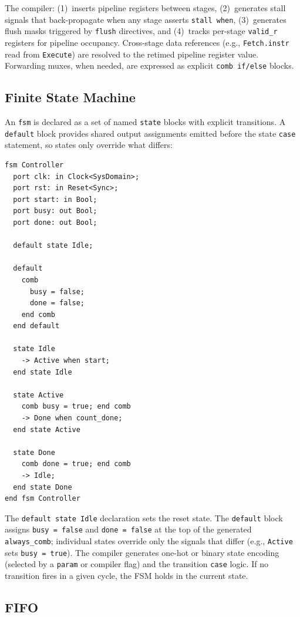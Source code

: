 \documentclass[11pt,twocolumn]{article}
\begin{document}
The compiler:
(1)~inserts pipeline registers between stages,
(2)~generates stall signals that back-propagate when any stage asserts \texttt{stall when},
(3)~generates flush masks triggered by \texttt{flush} directives, and
(4)~tracks per-stage \texttt{valid\_r} registers for pipeline occupancy.
Cross-stage data references (e.g., \texttt{Fetch.instr} read from \texttt{Execute}) are resolved to the retimed pipeline register value. Forwarding muxes, when needed, are expressed as explicit \texttt{comb if/else} blocks.

\subsection{Finite State Machine}

An \texttt{fsm} is declared as a set of named \texttt{state} blocks with explicit transitions. A \texttt{default} block provides shared output assignments emitted before the state \texttt{case} statement, so states only override what differs:

\begin{lstlisting}[language=Arch,caption={FSM with default block and transitions},label={lst:fsm}]
fsm Controller
  port clk: in Clock<SysDomain>;
  port rst: in Reset<Sync>;
  port start: in Bool;
  port busy: out Bool;
  port done: out Bool;

  default state Idle;

  default
    comb
      busy = false;
      done = false;
    end comb
  end default

  state Idle
    -> Active when start;
  end state Idle

  state Active
    comb busy = true; end comb
    -> Done when count_done;
  end state Active

  state Done
    comb done = true; end comb
    -> Idle;
  end state Done
end fsm Controller
\end{lstlisting}

The \texttt{default state Idle} declaration sets the reset state. The \texttt{default} block assigns \texttt{busy = false} and \texttt{done = false} at the top of the generated \texttt{always\_comb}; individual states override only the signals that differ (e.g., \texttt{Active} sets \texttt{busy = true}). The compiler generates one-hot or binary state encoding (selected by a \texttt{param} or compiler flag) and the transition \texttt{case} logic. If no transition fires in a given cycle, the FSM holds in the current state.

\subsection{FIFO}
\end{document}
